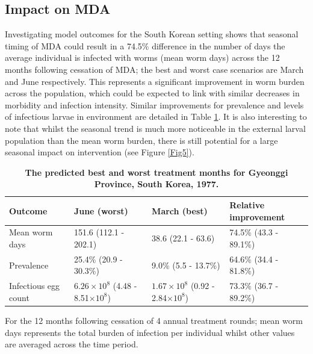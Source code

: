 \subsection{Impact on MDA}

Investigating model outcomes for the South Korean setting shows that seasonal timing of MDA could result in a 74.5\% difference in the number of days the average individual is infected with worms (mean worm days) across the 12 months following cessation of MDA; the best and worst case scenarios are March and June respectively. This represents a significant improvement in worm burden across the population, which could be expected to link with similar decreases in morbidity and infection intensity. Similar improvements for prevalence and levels of infectious larvae in environment are detailed in Table \ref{tab:outcome}. It is also interesting to note that whilst the seasonal trend is much more noticeable in the external larval population than the mean worm burden, there is still potential for a large seasonal impact on intervention (see Figure \ref{Fig5}).

\begin{table}
\centering
\caption[MDA predictions (South Korea)]{
{\bf The predicted best and worst treatment months for Gyeonggi Province, South Korea, 1977.}}
\begin{tabular}{|l|l|l|l|}
\hline
\multicolumn{1}{|l|}{\bf Outcome} & \multicolumn{1}{|l|}{\bf June (worst)} &
\multicolumn{1}{|l|}{\bf March (best)} &
\multicolumn{1}{|l|}{\bf Relative improvement} \\ \hline
Mean worm days & 151.6 (112.1 - 202.1) & 38.6 (22.1 - 63.6) & 74.5\% (43.3 - 89.1\%) \\ \hline
Prevalence & 25.4\% (20.9 - 30.3\%) & 9.0\% (5.5 - 13.7\%) & 64.6\% (34.4 - 81.8\%)\\ \hline
Infectious egg count & $6.26\times10^8$ (4.48 - 8.51$\times10^8$) & $1.67\times10^8$ (0.92 - 2.84$\times10^8$) & 73.3\% (36.7 - 89.2\%) \\ \hline
\end{tabular}
\label{tab:outcome}
\begin{flushleft} For the 12 months following cessation of 4 annual treatment rounds; mean worm days represents the total burden of infection per individual whilst other values are averaged across the time period.
\end{flushleft}
\end{table}


